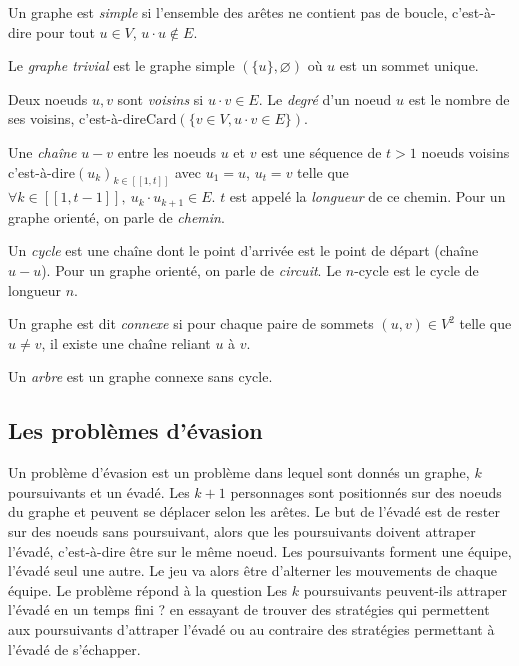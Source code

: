 \documentclass[12pt]{article}
\newcommand{\card}[1]{\text{Card}(#1)}
\newcommand{\inN}[2]{\in[\![#1,#2]\!]}
\newcommand{\cad}{c'est-à-dire\xspace}
\begin{document}
Un graphe est \emph{simple} si l'ensemble des arêtes ne contient pas de boucle, \cad pour tout $u\in V$, $u \cdot u \notin E$.

Le \emph{graphe trivial} est le graphe simple $(\{u\},\varnothing)$ où $u$ est un sommet unique.

Deux noeuds $u,v$ sont \emph{voisins} si $u\cdot v \in E$. Le \emph{degré} d'un noeud $u$ est le nombre de ses voisins, \cad $\card{\{v\in V, u \cdot v \in E\}}$.

Une \emph{chaîne} $u-v$ entre les noeuds $u$ et $v$ est une séquence de $t>1$ noeuds voisins \cad $(u_k)_{k\inN{1}{t}}$ avec $u_1=u$, $u_t=v$ telle que $\forall k\inN{1}{t-1},\ u_{k} \cdot u_{k+1} \in E$. $t$ est appelé la \emph{longueur} de ce chemin. Pour un graphe orienté, on parle de \emph{chemin}.

Un \emph{cycle} est une chaîne dont le point d'arrivée est le point de départ (chaîne $u-u$). Pour un graphe orienté, on parle de \emph{circuit}. Le $n$-cycle est le cycle de longueur $n$.

Un graphe est dit \emph{connexe} si pour chaque paire de sommets $(u,v) \in V^2$ telle que $u \neq v$, il existe une chaîne reliant $u$ à $v$.

Un \emph{arbre} est un graphe connexe sans cycle.

\subsection{Les problèmes d'évasion}

Un problème d'évasion est un problème dans lequel sont donnés un graphe, $k$ poursuivants et un évadé. Les $k+1$ personnages sont positionnés sur des noeuds du graphe et peuvent se déplacer selon les arêtes. Le but de l'évadé est de rester sur des noeuds sans poursuivant, alors que les poursuivants doivent attraper l'évadé, \cad être sur le même noeud. Les poursuivants forment une équipe, l'évadé seul une autre. Le jeu va alors être d'alterner les mouvements de chaque équipe. Le problème répond à la question \og Les $k$ poursuivants peuvent-ils attraper l'évadé en un temps fini ? \fg en essayant de trouver des stratégies qui permettent aux poursuivants d'attraper l'évadé ou au contraire des stratégies permettant à l'évadé de s'échapper. 
\end{document}
